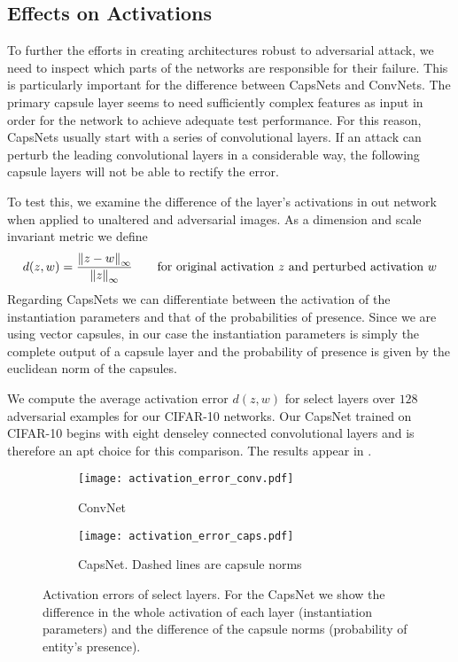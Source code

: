 \subsection{Effects on Activations}

To further the efforts in creating architectures robust to adversarial attack, we need to inspect which parts of the networks are responsible for their failure.
This is particularly important for the difference between CapsNets and ConvNets.
The primary capsule layer seems to need sufficiently complex features as input in order for the network to achieve adequate test performance.
For this reason, CapsNets usually start with a series of convolutional layers.
If an attack can perturb the leading convolutional layers in a considerable way, the following capsule layers will not be able to rectify the error.

To test this, we examine the difference of the layer's activations in out network when applied to unaltered and adversarial images. As a dimension and scale invariant metric we define
\begin{equation}
	d(z, w) = \frac{\norm[\infty]{z - w}}{\norm[\infty]{z}}
	\qquad \text{for original activation $z$ and perturbed activation $w$}
\end{equation}
Regarding CapsNets we can differentiate between the activation of the instantiation parameters and that of the probabilities of presence. Since we are using vector capsules, in our case the instantiation parameters is simply the complete output of a capsule layer and the probability of presence is given by the euclidean norm of the capsules.

We compute the average activation error $d(z, w)$ for select layers over $128$ adversarial examples for our CIFAR-10 networks. Our CapsNet trained on CIFAR-10 begins with eight denseley connected convolutional layers and is therefore an apt choice for this comparison.
The results appear in .

\begin{figure}
	\centering
	
	\begin{subfigure}{.5\textwidth}
		\texttt{[image: activation\_error\_conv.pdf]}
		\caption{ConvNet}
	\end{subfigure}%
	\begin{subfigure}{.5\textwidth}
		\texttt{[image: activation\_error\_caps.pdf]}
		\caption{CapsNet. Dashed lines are capsule norms}
	\end{subfigure}
	\caption[Activation errors]{Activation errors of select layers. For the CapsNet we show the difference in the whole activation of each layer (instantiation parameters) and the difference of the capsule norms (probability of entity's presence).}
	\label{fig:activation}
\end{figure}

